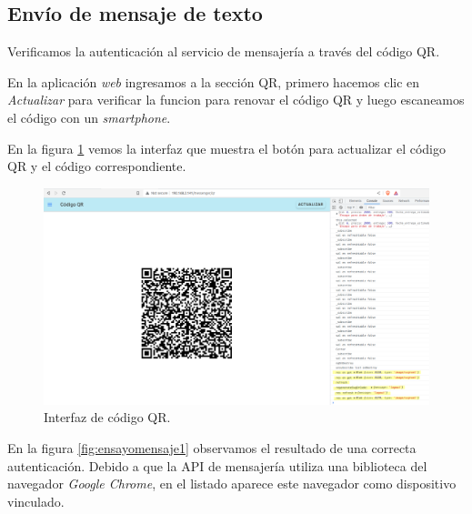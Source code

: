 \subsection{Envío de mensaje de texto}
\label{subsec:ensayomensaje}

Verificamos la autenticación al servicio de mensajería a través del código QR. 

En la aplicación \textit{web} ingresamos a la sección QR, primero hacemos clic en \textit{Actualizar} para verificar la funcion para renovar el código QR y luego escaneamos el código con un \textit{smartphone}.

En la figura \ref{fig:ensayoqr} vemos la interfaz que muestra el botón para actualizar el código QR y el código correspondiente. 

\begin{figure}[H]
	\centering
	\includegraphics[width=\textwidth]{./Figures/ensayo-1/15.qr.png}
	\caption{Interfaz de código QR.}
	\label{fig:ensayoqr}
\end{figure}

En la figura \ref{fig:ensayomensaje1} observamos el resultado de una correcta autenticación. Debido a que la API de mensajería utiliza una biblioteca del navegador \textit{Google Chrome}, en el listado aparece este navegador como dispositivo vinculado.

